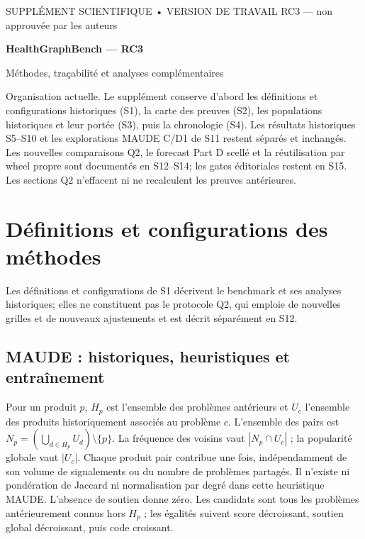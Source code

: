\documentclass[10pt,a4paper]{article}
\begin{document}
\begin{center}
{\small SUPPLÉMENT SCIENTIFIQUE • VERSION DE TRAVAIL RC3 — non approuvée par les auteurs}\par\vspace{7pt}
{\LARGE\bfseries HealthGraphBench — RC3}\par\vspace{6pt}
{\large Méthodes, traçabilité et analyses complémentaires}
\end{center}

Organisation actuelle. Le supplément conserve d'abord les définitions et configurations historiques (S1), la carte des preuves (S2), les populations historiques et leur portée (S3), puis la chronologie (S4). Les résultats historiques S5--S10 et les explorations MAUDE C/D1 de S11 restent séparés et inchangés. Les nouvelles comparaisons Q2, le forecast Part D scellé et la réutilisation par wheel propre sont documentés en S12--S14; les gates éditoriales restent en S15. Les sections Q2 n'effacent ni ne recalculent les preuves antérieures.

\par{}
\section{Définitions et configurations des méthodes}
\label{supp:methods}
Les définitions et configurations de S1 décrivent le benchmark et ses analyses historiques; elles ne constituent pas le protocole Q2, qui emploie de nouvelles grilles et de nouveaux ajustements et est décrit séparément en S12.
\subsection{MAUDE : historiques, heuristiques et entraînement}
Pour un produit $p$, $H_p$ est l'ensemble des problèmes antérieurs et $U_c$ l'ensemble des produits historiquement associés au problème $c$. L'ensemble des pairs est $N_p=(\bigcup_{d\in H_p}U_d)\setminus\{p\}$. La fréquence des voisins vaut $|N_p\cap U_c|$ ; la popularité globale vaut $|U_c|$. Chaque produit pair contribue une fois, indépendamment de son volume de signalements ou du nombre de problèmes partagés. Il n'existe ni pondération de Jaccard ni normalisation par degré dans cette heuristique MAUDE. L'absence de soutien donne zéro. Les candidats sont tous les problèmes antérieurement connus hors $H_p$ ; les égalités suivent score décroissant, soutien global décroissant, puis code croissant\cite{hgbcode}.
\end{document}
